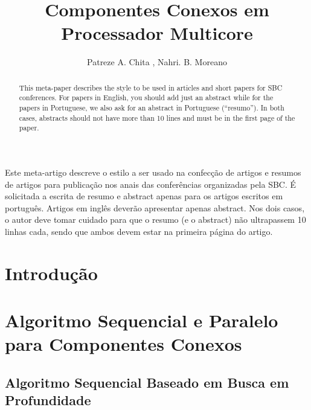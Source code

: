 \documentclass[12pt]{article}
\title{Componentes Conexos em Processador Multicore}
\author{Patreze A. Chita \inst{1}, Nahri. B. Moreano\inst{1}}
\begin{document}
 

\maketitle

\begin{abstract}
  This meta-paper describes the style to be used in articles and short papers
  for SBC conferences. For papers in English, you should add just an abstract
  while for the papers in Portuguese, we also ask for an abstract in
  Portuguese (``resumo''). In both cases, abstracts should not have more than
  10 lines and must be in the first page of the paper.
\end{abstract}
     
\begin{resumo} 
  Este meta-artigo descreve o estilo a ser usado na confecção de artigos e
  resumos de artigos para publicação nos anais das conferências organizadas
  pela SBC. É solicitada a escrita de resumo e abstract apenas para os artigos
  escritos em português. Artigos em inglês deverão apresentar apenas abstract.
  Nos dois casos, o autor deve tomar cuidado para que o resumo (e o abstract)
  não ultrapassem 10 linhas cada, sendo que ambos devem estar na primeira
  página do artigo.
\end{resumo}

\section{Introdução}
{\color{gray}\lipsum[1]}

\section{Algoritmo Sequencial e Paralelo para Componentes Conexos}
{\color{gray}\lipsum[1]}

\subsection{Algoritmo Sequencial Baseado em Busca em Profundidade}

{\color{gray}\lipsum[1]}
\end{document}
